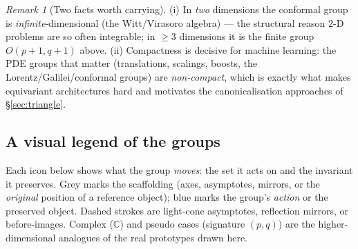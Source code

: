 \documentclass[11pt]{article}
\theoremstyle{definition}
\theoremstyle{remark}
\newtheorem{remark}{Remark}[section]
\begin{document}
\begin{remark}[Two facts worth carrying]
(i) In \emph{two} dimensions the conformal group is \emph{infinite}-dimensional (the Witt/Virasoro
algebra) --- the structural reason $2$-D problems are so often integrable; in $\ge3$ dimensions it is the
finite group $O(p{+}1,q{+}1)$ above. (ii) Compactness is decisive for machine learning: the PDE groups
that matter (translations, scalings, boosts, the Lorentz/Galilei/conformal groups) are
\emph{non-compact}, which is exactly what makes equivariant architectures hard and motivates the
canonicalisation approaches of \S\ref{sec:triangle}.
\end{remark}

\subsection{A visual legend of the groups}
\label{sec:zoo}

Each icon below shows what the group \emph{moves}: the set it acts on and the invariant it preserves.
Grey marks the scaffolding (axes, asymptotes, mirrors, or the \emph{original} position of a reference
object); blue marks the group's \emph{action} or the preserved object. Dashed strokes are light-cone
asymptotes, reflection mirrors, or before-images. Complex ($\mathbb{C}$) and pseudo cases (signature
$(p,q)$) are the higher-dimensional analogues of the real prototypes drawn here.
\end{document}
